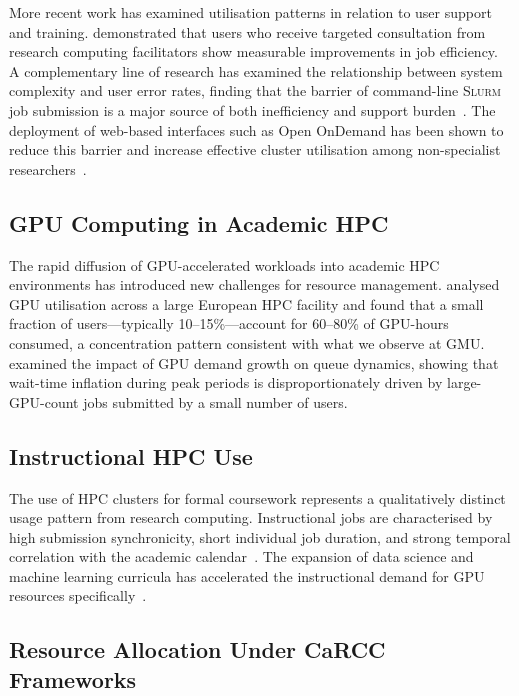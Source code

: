 \documentclass[11pt,letterpaper]{article}
\newcommand{\slurm}{\textsc{Slurm}}
\newcommand{\gmu}{GMU}
\begin{document}
More recent work has examined utilisation patterns in relation to user support
and training.  \citet{kilpatrick2019} demonstrated that users who receive targeted
consultation from research computing facilitators show measurable improvements in
job efficiency.  A complementary line of research has examined the relationship
between system complexity and user error rates, finding that the barrier of
command-line \slurm{} job submission is a major source of both inefficiency and
support burden~\citep{ragavan2020}.  The deployment of web-based interfaces such
as Open OnDemand has been shown to reduce this barrier and increase effective
cluster utilisation among non-specialist researchers~\citep{hudak2016}.

\subsection{GPU Computing in Academic HPC}

The rapid diffusion of GPU-accelerated workloads into academic HPC environments
has introduced new challenges for resource management.  \citet{netti2019} analysed
GPU utilisation across a large European HPC facility and found that a small
fraction of users---typically 10--15\%---account for 60--80\% of GPU-hours
consumed, a concentration pattern consistent with what we observe at \gmu.
\citet{chard2015} examined the impact of GPU demand growth on queue dynamics,
showing that wait-time inflation during peak periods is disproportionately driven
by large-GPU-count jobs submitted by a small number of users.

\subsection{Instructional HPC Use}

The use of HPC clusters for formal coursework represents a qualitatively distinct
usage pattern from research computing.  Instructional jobs are characterised by
high submission synchronicity, short individual job duration, and strong temporal
correlation with the academic calendar~\citep{sill2020}.  The expansion of data
science and machine learning curricula has accelerated the instructional demand
for GPU resources specifically~\citep{wehner2021}.

\subsection{Resource Allocation Under CaRCC Frameworks}
\end{document}
